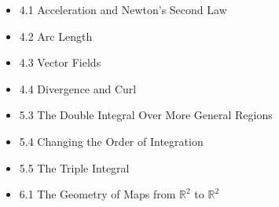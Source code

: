 \documentclass[11pt]{article}
\theoremstyle{plain}
\theoremstyle{definition}
\theoremstyle{remark}
\newcommand{\<}{\langle}
\renewcommand{\>}{\rangle}
\newcommand{\mb}{\mathbb}
\begin{document}
\begin{itemize}
  \item 4.1 Acceleration and Newton's Second Law
  \item 4.2 Arc Length
  \item 4.3 Vector Fields
  \item 4.4 Divergence and Curl
  \item 5.3 The Double Integral Over More General Regions
  \item 5.4 Changing the Order of Integration
  \item 5.5 The Triple Integral
  \item 6.1 The Geometry of Maps from \(\mb R^2\) to \(\mb R^2\)



\end{itemize}
\end{document}
